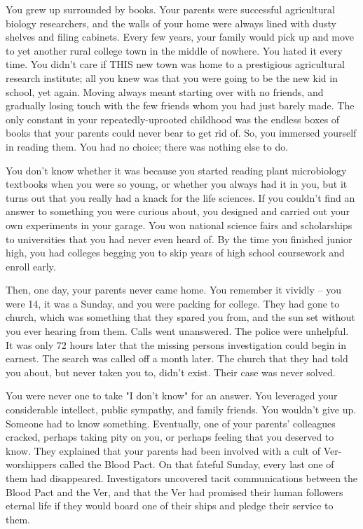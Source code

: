 \documentclass[char]{guildcamp4}
\begin{document}
\name{\cSpite{}}

You grew up surrounded by books. Your parents were successful agricultural biology researchers, and the walls of your home were always lined with dusty shelves and filing cabinets. Every few years, your family would pick up and move to yet another rural college town in the middle of nowhere. You hated it every time. You didn't care if THIS new town was home to a prestigious agricultural research institute; all you knew was that you were going to be the new kid in school, yet again. Moving always meant starting over with no friends, and gradually losing touch with the few friends whom you had just barely made. The only constant in your repeatedly-uprooted childhood was the endless boxes of books that your parents could never bear to get rid of. So, you immersed yourself in reading them. You had no choice; there was nothing else to do.

You don't know whether it was because you started reading plant microbiology textbooks when you were so young, or whether you always had it in you, but it turns out that you really had a knack for the life sciences. If you couldn't find an answer to something you were curious about, you designed and carried out your own experiments in your garage. You won national science fairs and scholarships to universities that you had never even heard of. By the time you finished junior high, you had colleges begging you to skip years of high school coursework and enroll early. 

Then, one day, your parents never came home. You remember it vividly -- you were 14, it was a Sunday, and you were packing for college. They had gone to church, which was something that they spared you from, and the sun set without you ever hearing from them. Calls went unanswered. The police were unhelpful. It was only 72 hours later that the missing persons investigation could begin in earnest. The search was called off a month later. The church that they had told you about, but never taken you to, didn't exist. Their case was never solved.

You were never one to take "I don't know" for an answer. You leveraged your considerable intellect, public sympathy, and family friends. You wouldn't give up. Someone had to know something. Eventually, one of your parents' colleagues cracked, perhaps taking pity on you, or perhaps feeling that you deserved to know. They explained that your parents had been involved with a cult of Ver-worshippers called the Blood Pact. On that fateful Sunday, every last one of them had disappeared. Investigators uncovered tacit communications between the Blood Pact and the Ver, and that the Ver had promised their human followers eternal life if they would board one of their ships and pledge their service to them. 
\end{document}
